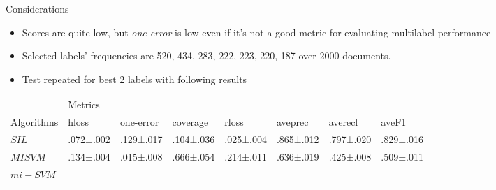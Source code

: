 \begin{frame}{Considerations}
	\begin{itemize}
		\item Scores are quite low, but \textit{one-error} is low even if it's not a good metric for evaluating multilabel performance
		\item Selected labels' frequencies are  520, 434, 283, 222, 223, 220, 187 over 2000 documents.
		\item Test repeated for best 2 labels with following results
	\end{itemize}

\begin{tiny}
	\begin{table}[]
\centering
\begin{tabular}{llllllll}
\hline
 & \multicolumn{7}{l}{Metrics} \\ \cline{2-8} 
Algorithms & hloss & one-error & coverage & rloss & aveprec & averecl & aveF1 \\ \hline
$SIL$ & .072±.002 & .129±.017 & .104±.036 & .025±.004 & .865±.012 & .797±.020 & .829±.016 \\
$MISVM$ & .134±.004 & .015±.008 & .666±.054 & .214±.011 & .636±.019 & .425±.008 & .509±.011 \\
$mi-SVM$ &  &  &  &  &  &  &  \\ \hline
\end{tabular}
\end{table}
\end{tiny}

\end{frame}